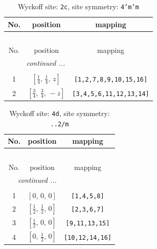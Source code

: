 \documentclass[fleqn,8pt]{jsarticle}
\begin{document}
\renewcommand{\arraystretch}{1.2}
\begin{longtable}{ccc}
\caption{Wyckoff site: {\tt 2c}, site symmetry: {\tt 4'm'm}}
 \\
 \hline \hline
No. & position & mapping \\ \hline \endfirsthead

\multicolumn{2}{l}{\tablename\ \thetable{}} \\
 \hline \hline
No. & position & mapping \\ \hline \endhead

 \hline \hline
\multicolumn{2}{r}{\footnotesize\it continued ...} \\ \endfoot

 \hline \hline
\multicolumn{2}{r}{} \\ \endlastfoot

1 & $\left[ \frac{1}{4},\, \frac{1}{4},\, z \right]$ & {\tt [1,2,7,8,9,10,15,16]} \\ \hline
2 & $\left[ \frac{3}{4},\, \frac{3}{4},\, - z \right]$ & {\tt [3,4,5,6,11,12,13,14]} \\
\end{longtable}
\renewcommand{\arraystretch}{1.2}
\begin{longtable}{ccc}
\caption{Wyckoff site: {\tt 4d}, site symmetry: {\tt ..2/m}}
 \\
 \hline \hline
No. & position & mapping \\ \hline \endfirsthead

\multicolumn{2}{l}{\tablename\ \thetable{}} \\
 \hline \hline
No. & position & mapping \\ \hline \endhead

 \hline \hline
\multicolumn{2}{r}{\footnotesize\it continued ...} \\ \endfoot

 \hline \hline
\multicolumn{2}{r}{} \\ \endlastfoot

1 & $\left[ 0,\, 0,\, 0 \right]$ & {\tt [1,4,5,8]} \\ \hline
2 & $\left[ \frac{1}{2},\, \frac{1}{2},\, 0 \right]$ & {\tt [2,3,6,7]} \\ \hline
3 & $\left[ \frac{1}{2},\, 0,\, 0 \right]$ & {\tt [9,11,13,15]} \\ \hline
4 & $\left[ 0,\, \frac{1}{2},\, 0 \right]$ & {\tt [10,12,14,16]} \\
\end{longtable}
\renewcommand{\arraystretch}{1.2}
\end{document}

